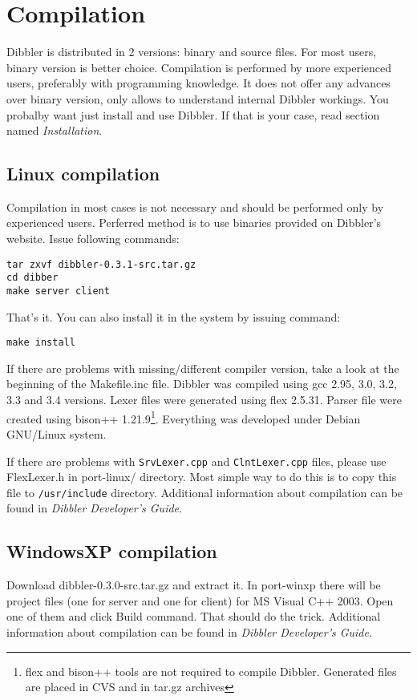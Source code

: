 \section{Compilation}
Dibbler is distributed in 2 versions: binary and source files. For
most users, binary version is better choice.  Compilation is
performed by more experienced users, preferably with programming
knowledge. It does not offer any advances over binary version, only
allows to understand internal Dibbler workings. You probalby want just
install and use Dibbler. If that is your case, read section
named \emph{Installation}.

\subsection{Linux compilation}

Compilation in most cases is not necessary and should be performed
only by experienced users. Perferred method is to use binaries
provided on Dibbler's website. Issue following commands:
\begin{verbatim}
tar zxvf dibbler-0.3.1-src.tar.gz
cd dibber
make server client
\end{verbatim}
That's it. You can also install it in the system by issuing command:

\begin{verbatim}
make install
\end{verbatim}

If there are problems with missing/different compiler
version, take a look at the beginning of the Makefile.inc
file. Dibbler was compiled using gcc 2.95, 3.0, 3.2, 3.3 and 3.4
versions. Lexer files were generated using flex 2.5.31. Parser file
were created using bison++ 1.21.9\footnote{flex and bison++ tools are
  not required to compile Dibbler. Generated files are placed in CVS
  and in tar.gz archives}. Everything was developed under Debian
GNU/Linux system.

If there are problems with \verb+SrvLexer.cpp+ and
\verb+ClntLexer.cpp+ files, please use FlexLexer.h in port-linux/
directory. Most simple way to do this is to copy this file to
\verb+/usr/include+ directory. Additional information about
compilation can be found in \emph{Dibbler Developer's Guide}.

\subsection{WindowsXP compilation}
Download dibbler-0.3.0-src.tar.gz and extract it. In port-winxp there
will be project files (one for server and one for client) for MS
Visual C++ 2003. Open one of them and click Build command. That should
do the trick. Additional information about compilation can be found in
\emph{Dibbler Developer's Guide}.
